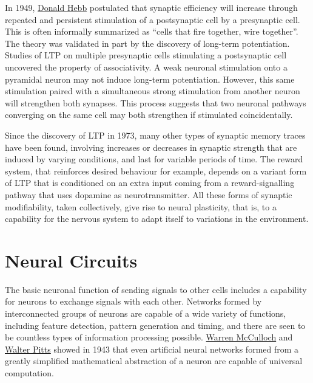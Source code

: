 In 1949, \href{https://en.wikipedia.org/wiki/Donald_O._Hebb}{Donald Hebb} postulated that synaptic efficiency will increase through repeated and persistent stimulation of a postsynaptic cell by a presynaptic cell. This is often informally summarized as ``cells that fire together, wire together''. The theory was validated in part by the discovery of long-term potentiation. Studies of LTP on multiple presynaptic cells stimulating a postsynaptic cell uncovered the property of associativity. A weak neuronal stimulation onto a pyramidal neuron may not induce long-term potentiation. However, this same stimulation paired with a simultaneous strong stimulation from another neuron will strengthen both synapses. This process suggests that two neuronal pathways converging on the same cell may both strengthen if stimulated coincidentally.

Since the discovery of LTP in 1973, many other types of synaptic memory traces have been found, involving increases or decreases in synaptic strength that are induced by varying conditions, and last for variable periods of time. The reward system, that reinforces desired behaviour for example, depends on a variant form of LTP that is conditioned on an extra input coming from a reward-signalling pathway that uses dopamine as neurotransmitter. All these forms of synaptic modifiability, taken collectively, give rise to neural plasticity, that is, to a capability for the nervous system to adapt itself to variations in the environment.

\hypertarget{neural-circuits}{%
\section{Neural Circuits}\label{neural-circuits}}

The basic neuronal function of sending signals to other cells includes a capability for neurons to exchange signals with each other. Networks formed by interconnected groups of neurons are capable of a wide variety of functions, including feature detection, pattern generation and timing, and there are seen to be countless types of information processing possible. \href{https://en.wikipedia.org/wiki/Warren_Sturgis_McCulloch}{Warren McCulloch} and \href{https://en.wikipedia.org/wiki/Walter_Pitts}{Walter Pitts} showed in 1943 that even artificial neural networks formed from a greatly simplified mathematical abstraction of a neuron are capable of universal computation.

